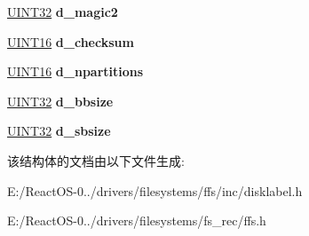 \begin{DoxyCompactItemize}
\item 
\mbox{\label{structdisklabel_a71bccbf7809c4f3244e2965c324b5312}} 
\hyperlink{_processor_bind_8h_ae1e6edbbc26d6fbc71a90190d0266018}{U\+I\+N\+T32} {\bfseries d\+\_\+magic2}
\item 
\mbox{\label{structdisklabel_ab1387801b1e72b2ce339e0eb7689030b}} 
\hyperlink{_processor_bind_8h_a09f1a1fb2293e33483cc8d44aefb1eb1}{U\+I\+N\+T16} {\bfseries d\+\_\+checksum}
\item 
\mbox{\label{structdisklabel_a21ad6737e156b6b2405be341486c772d}} 
\hyperlink{_processor_bind_8h_a09f1a1fb2293e33483cc8d44aefb1eb1}{U\+I\+N\+T16} {\bfseries d\+\_\+npartitions}
\item 
\mbox{\label{structdisklabel_a6ba03df5b2abb8c611af8163184bc226}} 
\hyperlink{_processor_bind_8h_ae1e6edbbc26d6fbc71a90190d0266018}{U\+I\+N\+T32} {\bfseries d\+\_\+bbsize}
\item 
\mbox{\label{structdisklabel_ab96d5d1966acd38da076ea15c74007bd}} 
\hyperlink{_processor_bind_8h_ae1e6edbbc26d6fbc71a90190d0266018}{U\+I\+N\+T32} {\bfseries d\+\_\+sbsize}
\end{DoxyCompactItemize}


该结构体的文档由以下文件生成\+:\begin{DoxyCompactItemize}
\item 
E\+:/\+React\+O\+S-\/0../drivers/filesystems/ffs/inc/disklabel.\+h\item 
E\+:/\+React\+O\+S-\/0../drivers/filesystems/fs\+\_\+rec/ffs.\+h\end{DoxyCompactItemize}
